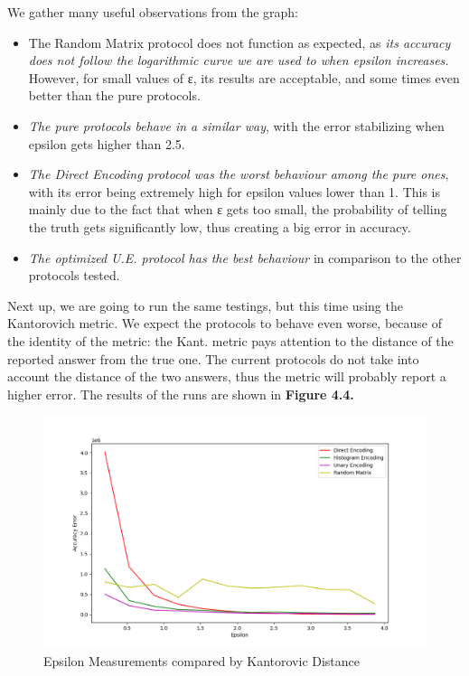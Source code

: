 We gather many useful observations from the graph:

\begin{itemize}
    \item The Random Matrix protocol does not function as expected, as \emph{its accuracy does not follow the logarithmic curve we are used to when epsilon increases.} However, for small values of ε, its results are acceptable, and some times even better than the pure protocols.
    \item \emph{The pure protocols behave in a similar way}, with the error stabilizing when epsilon gets higher than 2.5. 
    \item \emph{The Direct Encoding protocol was the worst behaviour among the pure ones}, with its error being extremely high for epsilon values lower than 1.  This is mainly due to the fact that when ε gets too small, the probability of telling the truth gets significantly low, thus creating a big error in accuracy.
    \item \emph{The optimized U.E. protocol has the best behaviour} in comparison to the other protocols tested.
\end{itemize}

Next up, we are going to run the same testings, but this time using the Kantorovich metric. We expect the protocols to behave even worse, because of the identity of the metric: the Kant. metric pays attention to the distance of the reported answer from the true one. The current protocols do not take into account the distance of the two answers, thus the metric will probably report a higher error. The results of the runs are shown in \textbf{Figure 4.4.}

\begin{figure}[!htb]\centering
    \includegraphics[width=1\textwidth]{images/epsilon_others_kant.png}
    \caption{Epsilon Measurements compared by Kantorovic Distance}
\end{figure}


